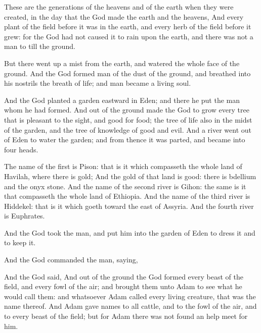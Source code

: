 \verse These are the generations of the heavens and of the earth when they were created, in the day that the \LORD God made the earth and the heavens,
\verse And every plant of the field before it was in the earth, and every herb of the field before it grew: for the \LORD God had not caused it to rain upon the earth, and there was not a man to till the ground.

\verse But there went up a mist from the earth, and watered the whole face of the ground.
\verse And the \LORD God formed man of the dust of the ground, and breathed into his nostrils the breath of life; and man became a living soul.

\verse And the \LORD God planted a garden eastward in Eden; and there he put the man whom he had formed.
\verse And out of the ground made the \LORD God to grow every tree that is pleasant to the sight, and good for food; the tree of life also in the midst of the garden, and the tree of knowledge of good and evil.
\verse And a river went out of Eden to water the garden; and from thence it was parted, and became into four heads.

\verse The name of the first is Pison: that is it which compasseth the whole land of Havilah, where there is gold; 
\verse And the gold of that land is good: there is bdellium and the onyx stone.
\verse And the name of the second river is Gihon: the same is it that compasseth the whole land of Ethiopia.
\verse And the name of the third river is Hiddekel: that is it which goeth toward the east of Assyria.  And the fourth river is Euphrates.

\verse And the \LORD God took the man, and put him into the garden of Eden to dress it and to keep it.

\verse And the \LORD God commanded the man, saying, 

\verse And the \LORD God said, 
\verse And out of the ground the \LORD God formed every beast of the field, and every fowl of the air; and brought them unto Adam to see what he would call them: and whatsoever Adam called every living creature, that was the name thereof.
\verse And Adam gave names to all cattle, and to the fowl of the air, and to every beast of the field; but for Adam there was not found an help meet for him.

